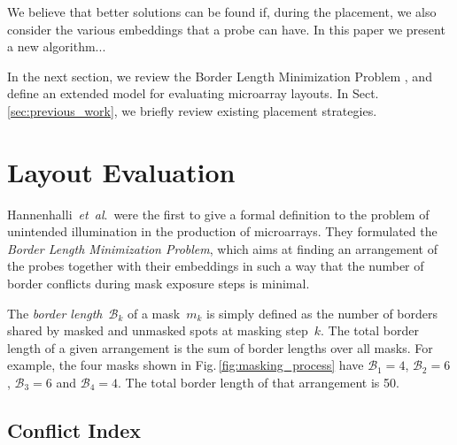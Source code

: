 \documentclass{llncs}
\begin{document}
We believe that better solutions can be found if, during the placement, we also
consider the various embeddings that a probe can have. In this paper we present
a new algorithm... %

In the next section, we review the Border Length Minimization Problem
\cite{HANNENHALLI02}, and define an extended model for evaluating microarray
layouts. In Sect.\,\ref{sec:previous_work}, we briefly review existing
placement strategies. %


\section{Layout Evaluation}
\label{sec:eval}

Hannenhalli~{\it et~al}.\ were the first to give a formal definition to the problem
of unintended illumination in the production of microarrays. They formulated the
\emph{Border Length Minimization Problem}\cite{HANNENHALLI02}, which aims at finding
an arrangement of the probes together with their embeddings in such a way that the number
of border conflicts during mask exposure steps is minimal.

The \emph{border length}~$\mathcal{B}_k$ of a mask~$m_{k}$ is simply
defined as the number of borders shared by masked and unmasked spots
at masking step~$k$. The total border length of a given arrangement is
the sum of border lengths over all masks. For example, the four masks
shown in Fig.\,\ref{fig:masking_process} have
$\mathcal{B}_1 = 4$, $\mathcal{B}_2 = 6$, $\mathcal{B}_3 = 6$ and $\mathcal{B}_4 = 4$.
The total border length of that arrangement is 50.

\subsection{Conflict Index}
\end{document}

